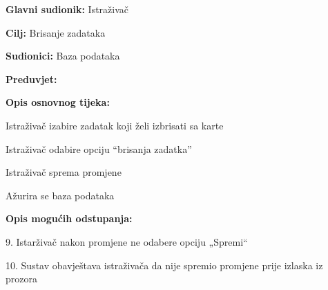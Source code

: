 					\noindent {}
					\begin{packed_item}
	
						\item \textbf{Glavni sudionik: } Istraživač
						\item  \textbf{Cilj:} Brisanje zadataka
						\item  \textbf{Sudionici:} Baza podataka
						\item  \textbf{Preduvjet:}
						\item  \textbf{Opis osnovnog tijeka:}
						
						\item[] \begin{packed_enum}
	
							\item 	Istraživač izabire zadatak koji želi izbrisati sa karte
							\item 	Istraživač odabire opciju “brisanja zadatka”
							\item 	Istraživač sprema promjene
							\item 	Ažurira se baza podataka
							
							
						\end{packed_enum}

						\item  \textbf{Opis mogućih odstupanja:}
						
						\item[] \begin{packed_item}
	
							\item[4.a] 9.	Istarživač nakon promjene ne odabere opciju „Spremi“
							\item[] \begin{packed_enum}
								
								\item 10.	Sustav obavještava istraživača da nije spremio promjene prije izlaska iz prozora 
								
							\end{packed_enum}

						\end{packed_item}
					\end{packed_item}%
